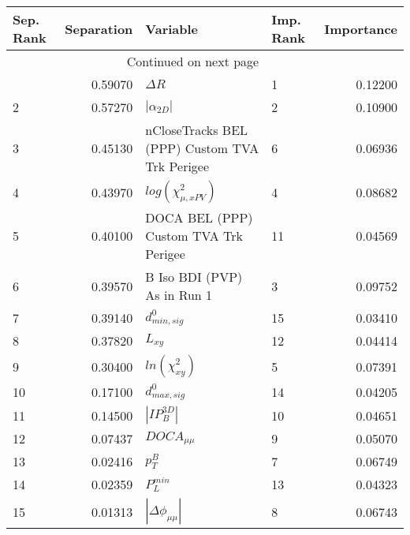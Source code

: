 \usepackage{lscape}

\begin{landscape}
\begin{longtable}{lrllr}
\toprule
Sep. Rank &  Separation &                                       Variable & Imp. Rank &  Importance \\
\midrule
\endhead
\midrule
\multicolumn{3}{r}{{Continued on next page}} \\
\midrule
\endfoot

\bottomrule
\endlastfoot
        1 &     0.59070 &                                     $\Delta R$ &         1 &     0.12200 \\
        2 &     0.57270 &                                $|\alpha_{2D}|$ &         2 &     0.10900 \\
        3 &     0.45130 &  nCloseTracks BEL (PPP) Custom TVA Trk Perigee &         6 &     0.06936 \\
        4 &     0.43970 &                      $log(\chi^{2}_{\mu,xPV})$ &         4 &     0.08682 \\
        5 &     0.40100 &          DOCA BEL (PPP) Custom TVA Trk Perigee &        11 &     0.04569 \\
        6 &     0.39570 &                    B Iso BDI (PVP) As in Run 1 &         3 &     0.09752 \\
        7 &     0.39140 &                               $d^0_{min, sig}$ &        15 &     0.03410 \\
        8 &     0.37820 &                                       $L_{xy}$ &        12 &     0.04414 \\
        9 &     0.30400 &                            $ln(\chi^{2}_{xy})$ &         5 &     0.07391 \\
       10 &     0.17100 &                               $d^0_{max, sig}$ &        14 &     0.04205 \\
       11 &     0.14500 &                                $|IP_{B}^{3D}|$ &        10 &     0.04651 \\
       12 &     0.07437 &                                $DOCA_{\mu\mu}$ &         9 &     0.05070 \\
       13 &     0.02416 &                                      $p^B_{T}$ &         7 &     0.06749 \\
       14 &     0.02359 &                                  $P^{min}_{L}$ &        13 &     0.04323 \\
       15 &     0.01313 &                       $|\Delta \phi_{\mu\mu}|$ &         8 &     0.06743 \\
\end{longtable}

\end{landscape}

